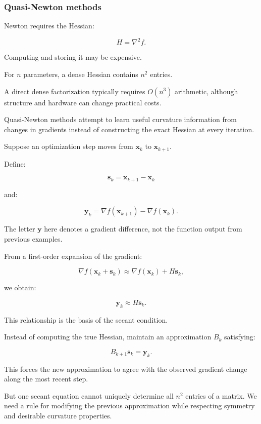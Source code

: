 \subsubsection{Quasi-Newton methods}\label{02-foundations-ii-ch026-quasi-newton-methods}

\hypertarget{02-foundations-ii-ch026-quasi-newton-methods}{}

Newton requires the Hessian:

\[
H=\nabla^2 f.
\]

Computing and storing it may be expensive.

For \(n\) parameters, a dense Hessian contains \(n^2\) entries.

A direct dense factorization typically requires \(O(n^3)\) arithmetic, although structure and hardware can change practical costs.

Quasi-Newton methods attempt to learn useful curvature information from changes in gradients instead of constructing the exact Hessian at every iteration.

Suppose an optimization step moves from \(\mathbf x_k\) to \(\mathbf x_{k+1}\).

Define:

\[
\boxed{ \mathbf s_k=\mathbf x_{k+1}-\mathbf x_k }
\]

and:

\[
\boxed{ \mathbf y_k= \nabla f(\mathbf x_{k+1})- \nabla f(\mathbf x_k) }.
\]

The letter \(\mathbf y\) here denotes a gradient difference, not the function output from previous examples.

From a first-order expansion of the gradient:

\[
\nabla f(\mathbf x_k+\mathbf s_k) \approx \nabla f(\mathbf x_k)+H\mathbf s_k,
\]

we obtain:

\[
\boxed{ \mathbf y_k\approx H\mathbf s_k }.
\]

This relationship is the basis of the secant condition.

Instead of computing the true Hessian, maintain an approximation \(B_k\) satisfying:

\[
\boxed{ B_{k+1}\mathbf s_k=\mathbf y_k }.
\]

This forces the new approximation to agree with the observed gradient change along the most recent step.

But one secant equation cannot uniquely determine all \(n^2\) entries of a matrix. We need a rule for modifying the previous approximation while respecting symmetry and desirable curvature properties.

